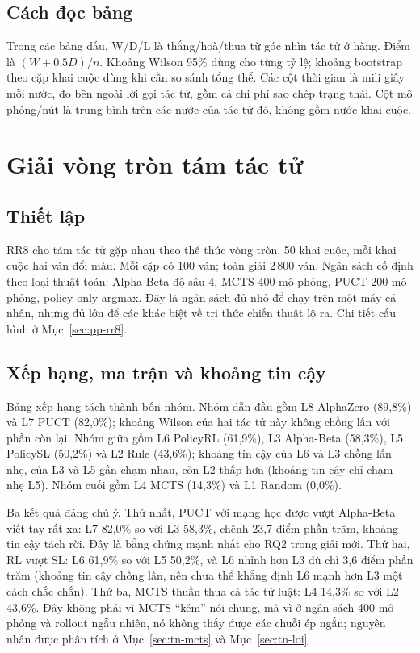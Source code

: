 \subsection{Cách đọc bảng}
Trong các bảng đấu, W/D/L là thắng/hoà/thua từ góc nhìn tác tử ở hàng. Điểm là
$(W+0.5D)/n$. Khoảng Wilson 95\% dùng cho từng tỷ lệ; khoảng bootstrap theo cặp khai cuộc dùng
khi cần so sánh tổng thể. Các cột thời gian là mili giây mỗi nước, đo bên ngoài lời gọi tác tử,
gồm cả chi phí sao chép trạng thái. Cột mô phỏng/nút là trung bình trên các nước của tác tử đó,
không gồm nước khai cuộc.

\section{Giải vòng tròn tám tác tử}
\label{sec:tn-rr8}
\subsection{Thiết lập}
RR8 cho tám tác tử gặp nhau theo thể thức vòng tròn, 50 khai cuộc, mỗi khai cuộc hai ván đổi
màu. Mỗi cặp có 100 ván; toàn giải 2\,800 ván. Ngân sách cố định theo loại thuật toán:
Alpha-Beta độ sâu 4, MCTS 400 mô phỏng, PUCT 200 mô phỏng, policy-only argmax. Đây là ngân sách
đủ nhỏ để chạy trên một máy cá nhân, nhưng đủ lớn để các khác biệt về tri thức chiến thuật lộ
ra. Chi tiết cấu hình ở Mục~\ref{sec:pp-rr8}.

\subsection{Xếp hạng, ma trận và khoảng tin cậy}
\begin{table}[H]
  \centering\small
  \caption{Xếp hạng RR8 (trên) và ma trận điểm phần trăm của tác tử hàng trước tác tử cột
  (dưới). Mỗi ô ma trận dựa trên 100 ván; dấu ``—'' là tự đấu.}
  \label{tab:tn-rr8}
  
\end{table}

Bảng xếp hạng tách thành bốn nhóm. Nhóm dẫn đầu gồm L8 AlphaZero (89,8\%) và L7 PUCT (82,0\%);
khoảng Wilson của hai tác tử này không chồng lấn với phần còn lại. Nhóm giữa gồm L6 PolicyRL
(61,9\%), L3 Alpha-Beta (58,3\%), L5 PolicySL (50,2\%) và L2 Rule (43,6\%); khoảng tin cậy của
L6 và L3 chồng lấn nhẹ, của L3 và L5 gần chạm nhau, còn L2 thấp hơn (khoảng tin cậy chỉ chạm
nhẹ L5). Nhóm cuối gồm L4 MCTS
(14,3\%) và L1 Random (0,0\%).

Ba kết quả đáng chú ý. Thứ nhất, PUCT với mạng học được vượt Alpha-Beta viết tay rất xa: L7
82,0\% so với L3 58,3\%, chênh 23,7 điểm phần trăm, khoảng tin cậy tách rời. Đây là bằng chứng
mạnh nhất cho RQ2 trong giải mới. Thứ hai, RL vượt SL: L6 61,9\% so với L5 50,2\%, và L6 nhỉnh
hơn L3 dù chỉ 3,6 điểm phần trăm (khoảng tin cậy chồng lấn, nên chưa thể khẳng định L6 mạnh
hơn L3 một cách chắc chắn). Thứ ba, MCTS thuần thua cả tác tử luật: L4 14,3\% so với L2 43,6\%.
Đây không phải vì MCTS ``kém'' nói chung, mà vì ở ngân sách 400 mô phỏng và rollout ngẫu nhiên,
nó không thấy được các chuỗi ép ngắn; nguyên nhân được phân tích ở Mục~\ref{sec:tn-mcts} và
Mục~\ref{sec:tn-loi}.


